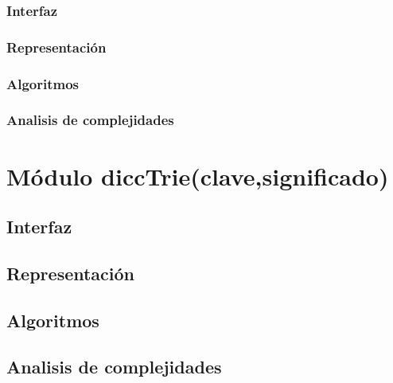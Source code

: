 \documentclass[12pt, a4paper]{article}
\begin{document}
\subsubsection{Interfaz}

\subsubsection{Representaci\'on}

\subsubsection{Algoritmos}

\subsubsection{Analisis de complejidades}

\newpage 
\section{M\'odulo diccTrie(clave,significado)}
\subsection{Interfaz}

\subsection{Representaci\'on}

\subsection{Algoritmos}

\subsection{Analisis de complejidades}

\newpage
\end{document}
